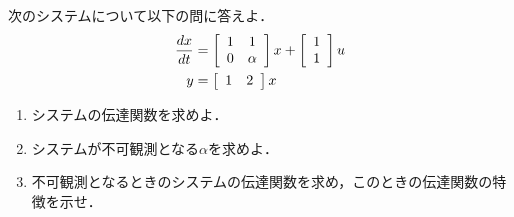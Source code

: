 \item
次のシステムについて以下の問に答えよ．
\begin{align}
	\frac{dx}{dt}
	&=	\bmatrix{cc}
			1 & 1 \\
			0 & \alpha
		\ematrix
		x
		+
		\bmatrix{c}
			1 \\
			1
		\ematrix
		u
\nonumber \\
	y 
	&=	\bmatrix{cc}
			1 & 2 
		\ematrix
		x
\nonumber 
\end{align}

\begin{enumerate}

\item 
システムの伝達関数を求めよ．
\vspace{4cm}

\item
システムが不可観測となる$\alpha$を求めよ．
\vspace{4cm}

\item
不可観測となるときのシステムの伝達関数を求め，このときの伝達関数の特徴を示せ．
\vspace{4cm}

\end{enumerate}
